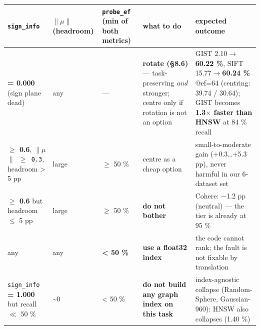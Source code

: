 \documentclass[
  10pt,
]{article}
\newcounter{none} %
\begin{document}
{\def\LTcaptype{none} %
\begin{longtable}[]{@{}
  >{\raggedright\arraybackslash}p{}
  >{\raggedright\arraybackslash}p{}
  >{\raggedright\arraybackslash}p{}
  >{\raggedright\arraybackslash}p{}
  >{\raggedright\arraybackslash}p{}@{}}
\toprule\noalign{}
\begin{minipage}[b]{\linewidth}\raggedright
\texttt{sign\_info}
\end{minipage} & \begin{minipage}[b]{\linewidth}\raggedright
\texttt{$\|$$\mu$$\|$} (headroom)
\end{minipage} & \begin{minipage}[b]{\linewidth}\raggedright
\texttt{probe\_ef} (min of both metrics)
\end{minipage} & \begin{minipage}[b]{\linewidth}\raggedright
what to do
\end{minipage} & \begin{minipage}[b]{\linewidth}\raggedright
expected outcome
\end{minipage} \\
\midrule\noalign{}
\endhead
\bottomrule\noalign{}
\endlastfoot
\textbf{= 0.000} (sign plane dead) & any & --- & \textbf{rotate (§8.6)}
--- task-preserving \emph{and} stronger; centre only if rotation is not
an option & GIST 2.10$\rightarrow$\textbf{60.22 \%}, SIFT 15.77$\rightarrow$\textbf{60.24 \%}
@ef=64 (centring: 39.74 / 30.64); GIST becomes \textbf{1.3$\times$ faster than
HNSW} at 84 \% recall \\
\textbf{$\geq$ 0.6}, \texttt{$\|$$\mu$$\|$\ $\geq$\ 0.3}, headroom \textgreater{} 5 pp &
large & $\geq$ 50 \% & centre as a cheap option & small-to-moderate gain
(+0.3\ldots+5.3 pp), never harmful in our 6-dataset set \\
\textbf{$\geq$ 0.6} but headroom $\leq$ 5 pp & large & $\geq$ 50 \% & \textbf{do not
bother} & Cohere: $-$1.2 pp (neutral) --- the tier is already at 95 \% \\
any & any & \textbf{\textless{} 50 \%} & \textbf{use a float32 index} &
the code cannot rank; the fault is not fixable by translation \\
\texttt{sign\_info} \textbf{= 1.000} but recall $\ll$ 50 \% &
\textasciitilde0 & \textless{} 50 \% & \textbf{do not build any graph
index on this task} & index-agnostic collapse (Random-Sphere,
Gaussian-960): HNSW also collapses (1.40 \%) \\
\end{longtable}
}
\end{document}
